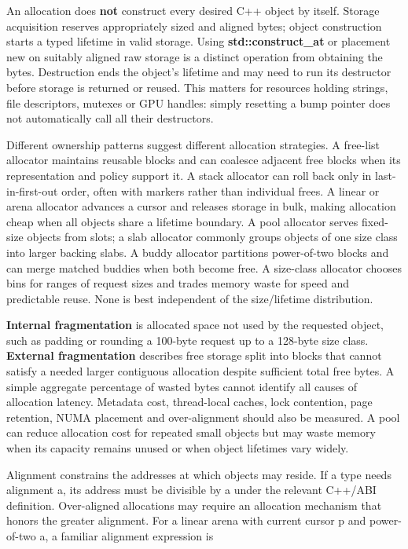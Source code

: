 An allocation does \textbf{not} construct every desired C++ object by itself. Storage acquisition reserves appropriately sized and aligned bytes; object construction starts a typed lifetime in valid storage. Using \textbf{std::construct\_at} or placement new on suitably aligned raw storage is a distinct operation from obtaining the bytes. Destruction ends the object's lifetime and may need to run its destructor before storage is returned or reused. This matters for resources holding strings, file descriptors, mutexes or GPU handles: simply resetting a bump pointer does not automatically call all their destructors.

Different ownership patterns suggest different allocation strategies. A free-list allocator maintains reusable blocks and can coalesce adjacent free blocks when its representation and policy support it. A stack allocator can roll back only in last-in-first-out order, often with markers rather than individual frees. A linear or arena allocator advances a cursor and releases storage in bulk, making allocation cheap when all objects share a lifetime boundary. A pool allocator serves fixed-size objects from slots; a slab allocator commonly groups objects of one size class into larger backing slabs. A buddy allocator partitions power-of-two blocks and can merge matched buddies when both become free. A size-class allocator chooses bins for ranges of request sizes and trades memory waste for speed and predictable reuse. None is best independent of the size/lifetime distribution.

\textbf{Internal fragmentation} is allocated space not used by the requested object, such as padding or rounding a 100-byte request up to a 128-byte size class. \textbf{External fragmentation} describes free storage split into blocks that cannot satisfy a needed larger contiguous allocation despite sufficient total free bytes. A simple aggregate percentage of wasted bytes cannot identify all causes of allocation latency. Metadata cost, thread-local caches, lock contention, page retention, NUMA placement and over-alignment should also be measured. A pool can reduce allocation cost for repeated small objects but may waste memory when its capacity remains unused or when object lifetimes vary widely.

Alignment constrains the addresses at which objects may reside. If a type needs alignment a, its address must be divisible by a under the relevant C++/ABI definition. Over-aligned allocations may require an allocation mechanism that honors the greater alignment. For a linear arena with current cursor p and power-of-two a, a familiar alignment expression is

